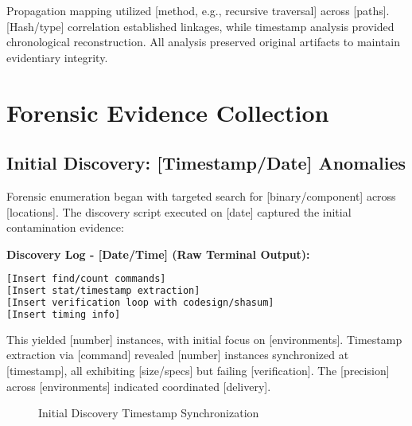 \documentclass[12pt,a4paper]{article}
\newcommand{\timestamp}[1]{\textbf{#1}}
\begin{document}
Propagation mapping utilized [method, e.g., recursive traversal] across [paths]. [Hash/type] correlation established linkages, while timestamp analysis provided chronological reconstruction. All analysis preserved original artifacts to maintain evidentiary integrity.

\newpage

\section{Forensic Evidence Collection}

\subsection{Initial Discovery: [Timestamp/Date] Anomalies}
Forensic enumeration began with targeted search for [binary/component] across [locations]. The discovery script executed on [date] captured the initial contamination evidence:

\textbf{Discovery Log - [Date/Time] (Raw Terminal Output):}
\begin{lstlisting}[style=terminal, caption={Timestamp Synchronization Discovery}, language=bash]
[Insert find/count commands]
[Insert stat/timestamp extraction]
[Insert verification loop with codesign/shasum]
[Insert timing info]
\end{lstlisting}

This yielded [number] instances, with initial focus on [environments]. Timestamp extraction via [command] revealed [number] instances synchronized at [timestamp], all exhibiting [size/specs] but failing [verification]. The [precision] across [environments] indicated coordinated [delivery].

\begin{figure}[htbp]
\centering
{}
\caption{Initial Discovery Timestamp Synchronization}
\label{fig:timestamp_sync}
\end{figure}
\end{document}
